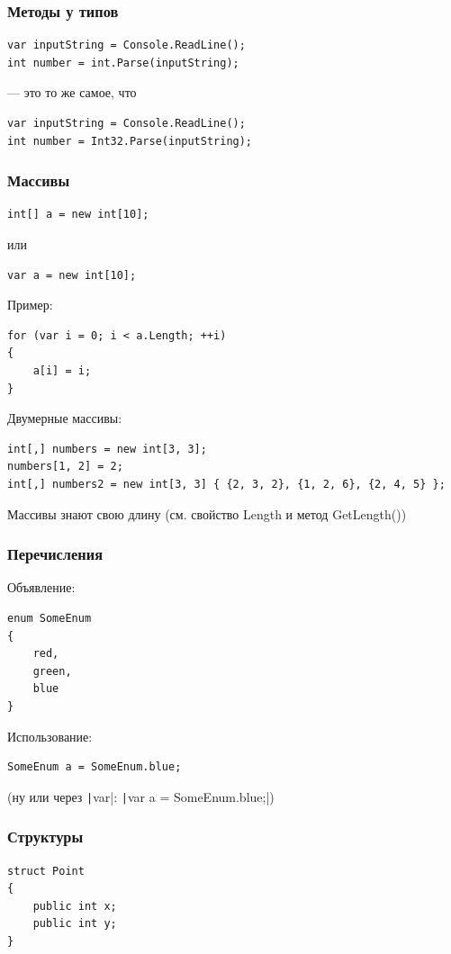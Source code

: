 \documentclass{../../slides-style}
\begin{document}
    \begin{frame}[fragile]
        \frametitle{Методы у типов}
        \begin{verbatim}
var inputString = Console.ReadLine();
int number = int.Parse(inputString);
        \end{verbatim}
        --- это то же самое, что
        \begin{verbatim}
var inputString = Console.ReadLine();
int number = Int32.Parse(inputString);
        \end{verbatim}
    \end{frame}

    \begin{frame}[fragile]
        \frametitle{Массивы}
        \begin{verbatim}
int[] a = new int[10];
        \end{verbatim}
        или
        \begin{verbatim}
var a = new int[10];
        \end{verbatim}
        Пример:
        \begin{verbatim}
for (var i = 0; i < a.Length; ++i)
{
    a[i] = i;
}
        \end{verbatim}
        Двумерные массивы:
        \begin{verbatim}
int[,] numbers = new int[3, 3];
numbers[1, 2] = 2; 
int[,] numbers2 = new int[3, 3] { {2, 3, 2}, {1, 2, 6}, {2, 4, 5} };
        \end{verbatim}
        Массивы знают свою длину (см. свойство Length и метод GetLength())
    \end{frame}

    \begin{frame}[fragile]
        \frametitle{Перечисления}
        Объявление:
        \begin{verbatim}
enum SomeEnum
{
    red,
    green,
    blue
}
        \end{verbatim}
        Использование:
        \begin{verbatim}
SomeEnum a = SomeEnum.blue;
        \end{verbatim}
        (ну или через \texttt|var|: \texttt|var a = SomeEnum.blue;|)
    \end{frame}

    \begin{frame}[fragile]
        \frametitle{Структуры}
        \begin{verbatim}
struct Point
{
    public int x;
    public int y;
}
        \end{verbatim}
    \end{frame}
\end{document}
